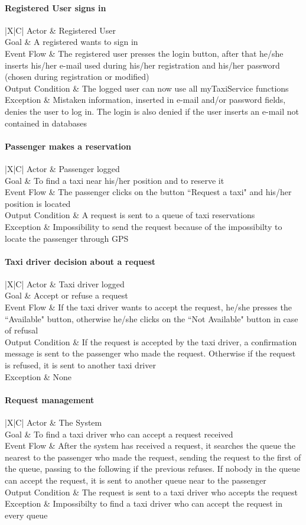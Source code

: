\documentclass[a4paper,12pt]{article}%
\newcounter{func_req_counter}
\newcommand{\usecasetable}[5]{
\begin{center}
\begin{tabularx}{\textwidth}{|X|C|}
\hline
Actor & #1\\
\hline
Goal & #2\\
\hline
Event Flow & #3\\
\hline
Output Condition & #4\\
\hline
Exception & #5\\
\hline
\end{tabularx}
\end{center}
}
\begin{document}
\paragraph{Registered User signs in}
\usecasetable {Registered User}{A registered wants to sign in}{The registered user presses the login button, after that he/she inserts his/her e-mail used during his/her registration and his/her password (chosen during registration or modified)}{The logged user can now use all myTaxiService functions}{Mistaken information, inserted in e-mail and/or password fields, denies the user to log in. The login is also denied if the user inserts an e-mail not contained in databases}
\paragraph{Passenger makes a reservation}
\usecasetable {Passenger logged}{To find a taxi near his/her position and to reserve it}{The passenger clicks on the button ``Request a taxi" and his/her position is located}{A request is sent to a queue of taxi reservations}{Impossibility to send the request because of the impossibilty to locate the passenger through GPS}
\paragraph{Taxi driver decision about a request}
\usecasetable {Taxi driver logged}{Accept or refuse a request}{If the taxi driver wants to accept the request, he/she presses the ``Available" button, otherwise he/she clicks on the ``Not Available" button in case of refusal}{If the request is accepted by the taxi driver, a confirmation message is sent to the passenger who made the request. Otherwise if the request is refused, it is sent to another taxi driver}{None}
\paragraph{Request management}
\usecasetable {The System}{To find a taxi driver who can accept a request received}{After the system has received a request, it searches the queue the nearest to the passenger who made the request, sending the request to the first of the queue, passing to the following if the previous refuses. If nobody in the queue can accept the request, it is sent to another queue near to the passenger}{The request is sent to a taxi driver who accepts the request}{Impossibilty to find a taxi driver who can accept the request in every queue}

\pagebreak
\end{document}

